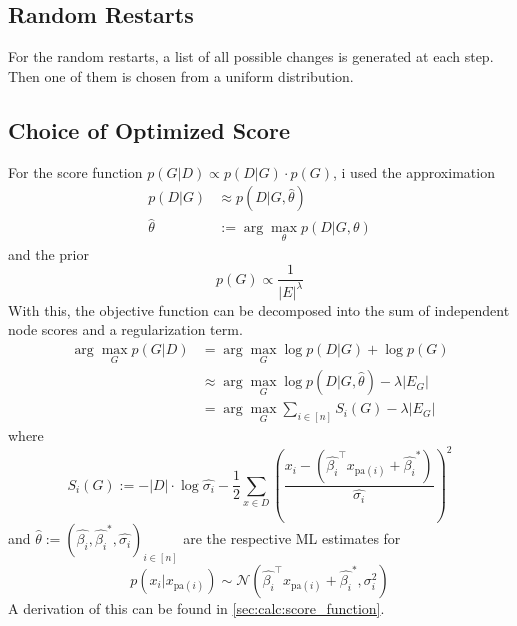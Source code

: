 \documentclass[sigconf, fleqn, prologue, dvipsnames]{acmart}
\newcommand{\abs}[1]{\left\vert #1 \right\vert}
\def\T{\top}
\def\pa{\text{pa}}
\begin{document}
\subsection{Random Restarts}
For the random restarts, a list of all possible changes is generated at each step.
Then one of them is chosen from a uniform distribution.


\subsection{Choice of Optimized Score}
For the score function $p(G | D) \propto p(D | G) \cdot p(G)$, i used the approximation
\begin{align*}
	p(D | G)     & \approx p(D | G, \hat{\theta})               \\
	\hat{\theta} & := \arg\max\limits_{\theta} p(D | G, \theta)
\end{align*}
and the prior
$$p(G) \propto \frac{1}{|E|^\lambda}$$
With this, the objective function can be decomposed into the sum of independent node scores and a regularization term.
\begin{align*}
	\arg\max\limits_G p(G | D) & = \arg\max\limits_G \log p(D | G) + \log p(G)                             \\
	                           & \approx \arg\max\limits_G \log p(D | G, \hat{\theta}) - \lambda \abs{E_G} \\
	                           & = \arg\max\limits_G \sum\limits_{i \in [n]} S_i(G) - \lambda \abs{E_G}
\end{align*}
where
$$S_i(G) := -\abs{D} \cdot \log \hat{\sigma_i} - \frac{1}{2} \sum\limits_{x \in D} \left(\frac{x_i - (\hat{\beta_i}^\T x_{\pa(i)} + \hat{\beta_i}^*)}{\hat{\sigma_i}}\right)^2$$
and $\hat{\theta} := \left(\hat{\beta_i}, \hat{\beta_i}^*, \hat{\sigma_i}\right)_{i \in [n]}$ are the respective ML estimates for
$$p(x_i | x_{\pa(i)}) \sim \mathcal{N}(\hat{\beta_i}^\T x_{\pa(i)} + \hat{\beta_i}^*, \sigma_i^2)$$
A derivation of this can be found in \autoref{sec:calc:score_function}.
\end{document}
